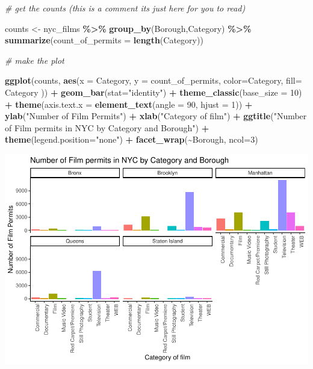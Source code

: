 \documentclass[
]{book}
\newenvironment{Shaded}{\begin{snugshade}}{\end{snugshade}}
\newcommand{\AttributeTok}[1]{\textcolor[rgb]{0.13,0.29,0.53}{#1}}
\newcommand{\CommentTok}[1]{\textcolor[rgb]{0.56,0.35,0.01}{\textit{#1}}}
\newcommand{\DecValTok}[1]{\textcolor[rgb]{0.00,0.00,0.81}{#1}}
\newcommand{\FunctionTok}[1]{\textcolor[rgb]{0.13,0.29,0.53}{\textbf{#1}}}
\newcommand{\NormalTok}[1]{#1}
\newcommand{\OtherTok}[1]{\textcolor[rgb]{0.56,0.35,0.01}{#1}}
\newcommand{\SpecialCharTok}[1]{\textcolor[rgb]{0.81,0.36,0.00}{\textbf{#1}}}
\newcommand{\StringTok}[1]{\textcolor[rgb]{0.31,0.60,0.02}{#1}}
\begin{document}
\begin{Shaded}
\begin{Highlighting}[]
\CommentTok{\# get the counts (this is a comment it\textquotesingle{}s just here for you to read)}

\NormalTok{counts }\OtherTok{\textless{}{-}}\NormalTok{ nyc\_films }\SpecialCharTok{\%\textgreater{}\%}
          \FunctionTok{group\_by}\NormalTok{(Borough,Category) }\SpecialCharTok{\%\textgreater{}\%}
          \FunctionTok{summarize}\NormalTok{(}\AttributeTok{count\_of\_permits =} \FunctionTok{length}\NormalTok{(Category))}

\CommentTok{\# make the plot}

\FunctionTok{ggplot}\NormalTok{(counts, }\FunctionTok{aes}\NormalTok{(}\AttributeTok{x =}\NormalTok{ Category, }\AttributeTok{y =}\NormalTok{ count\_of\_permits, }
                   \AttributeTok{color=}\NormalTok{Category, }
                   \AttributeTok{fill=}\NormalTok{ Category )) }\SpecialCharTok{+}
  \FunctionTok{geom\_bar}\NormalTok{(}\AttributeTok{stat=}\StringTok{"identity"}\NormalTok{) }\SpecialCharTok{+} 
  \FunctionTok{theme\_classic}\NormalTok{(}\AttributeTok{base\_size =} \DecValTok{10}\NormalTok{) }\SpecialCharTok{+}
  \FunctionTok{theme}\NormalTok{(}\AttributeTok{axis.text.x =} \FunctionTok{element\_text}\NormalTok{(}\AttributeTok{angle =} \DecValTok{90}\NormalTok{, }\AttributeTok{hjust =} \DecValTok{1}\NormalTok{)) }\SpecialCharTok{+}
  \FunctionTok{ylab}\NormalTok{(}\StringTok{"Number of Film Permits"}\NormalTok{) }\SpecialCharTok{+} 
  \FunctionTok{xlab}\NormalTok{(}\StringTok{"Category of film"}\NormalTok{) }\SpecialCharTok{+}
  \FunctionTok{ggtitle}\NormalTok{(}\StringTok{"Number of Film permits in NYC by Category and Borough"}\NormalTok{) }\SpecialCharTok{+}
  \FunctionTok{theme}\NormalTok{(}\AttributeTok{legend.position=}\StringTok{"none"}\NormalTok{) }\SpecialCharTok{+}
  \FunctionTok{facet\_wrap}\NormalTok{(}\SpecialCharTok{\textasciitilde{}}\NormalTok{Borough, }\AttributeTok{ncol=}\DecValTok{3}\NormalTok{)}
\end{Highlighting}
\end{Shaded}

\includegraphics{Statistics_Lab_files/figure-latex/1facetwrap-1.pdf}
\end{document}
